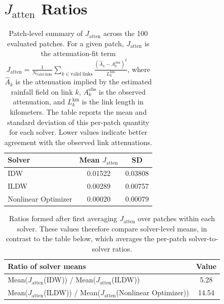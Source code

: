 \documentclass[11pt]{article}
\begin{document}
\section*{$J_{\mathrm{atten}}$ Ratios}
\begin{table}[H]
  \centering
  \begin{tabular}{lcc}
    \toprule
    Solver & Mean $J_{\mathrm{atten}}$ & SD \\
    \midrule
    IDW & 0.01522 & 0.03808 \\
    ILDW & 0.00289 & 0.00757 \\
    Nonlinear Optimizer & 0.00020 & 0.00079 \\
    \bottomrule
  \end{tabular}
  \caption{Patch-level summary of $J_{\mathrm{atten}}$ across the 100 evaluated patches. For a given patch, $J_{\mathrm{atten}}$ is the attenuation-fit term $J_{\mathrm{atten}} = \frac{1}{N_{\mathrm{valid\ links}}}\sum_{k \in \mathrm{valid\ links}} \frac{\left(\hat{A}_k - A_k^{\mathrm{obs}}\right)^2}{L_k^{\mathrm{km}}}$, where $\hat{A}_k$ is the attenuation implied by the estimated rainfall field on link $k$, $A_k^{\mathrm{obs}}$ is the observed attenuation, and $L_k^{\mathrm{km}}$ is the link length in kilometers. The table reports the mean and standard deviation of this per-patch quantity for each solver. Lower values indicate better agreement with the observed link attenuations.}
\end{table}

\begin{table}[H]
  \centering
  \begin{tabular}{lc}
    \toprule
    Ratio of solver means & Value \\
    \midrule
    Mean($J_{\mathrm{atten}}$(IDW)) / Mean($J_{\mathrm{atten}}$(ILDW)) & 5.28 \\
    Mean($J_{\mathrm{atten}}$(ILDW)) / Mean($J_{\mathrm{atten}}$(Nonlinear Optimizer)) & 14.54 \\
    \bottomrule
  \end{tabular}
  \caption{Ratios formed after first averaging $J_{\mathrm{atten}}$ over patches within each solver. These values therefore compare solver-level means, in contrast to the table below, which averages the per-patch solver-to-solver ratios.}
\end{table}
\end{document}
